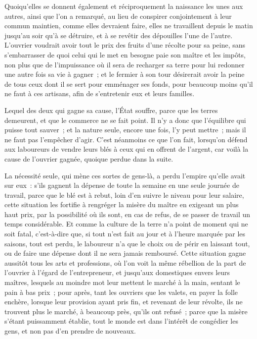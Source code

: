 \documentclass[french,twoside]{book} %
\begin{document}
Quoiqu’elles se donnent également et réciproquement la naissance les unes aux autres, ainsi que l’on a remarqué, au lieu de conspirer conjointement à leur commun maintien, comme elles devraient faire, elles ne travaillent depuis le matin jusqu’au soir qu’à se détruire, et à se revêtir des dépouilles l’une de l’autre. L’ouvrier voudrait avoir tout le prix des fruits d’une récolte pour sa peine, sans s’embarrasser de quoi celui qui le met en besogne paie son maître et les impôts, non plus que de l’impuissance où il sera de recharger sa terre pour lui redonner une autre fois sa vie à gagner ; et le fermier à son tour désirerait avoir la peine de tous ceux dont il se sert pour emménager ses fonds, pour beaucoup moins qu’il ne faut à ces artisans, afin de s’entretenir eux et leurs familles.\par
Lequel des deux qui gagne sa cause, l’État souffre, parce que les terres demeurent, et que le commerce ne se fait point. Il n’y a donc que l’équilibre qui puisse tout sauver ; et la nature seule, encore une fois, l’y peut mettre ; mais il ne faut pas l’empêcher d’agir. C’est néanmoins ce que l’on fait, lorsqu’on défend aux laboureurs de vendre leurs blés à ceux qui en offrent de l’argent, car voilà la cause de l’ouvrier gagnée, quoique perdue dans la suite.\par
La nécessité seule, qui mène ces sortes de gens-là, a perdu l’empire qu’elle avait sur eux : s’ils gagnent la dépense de toute la semaine en une seule journée de travail, parce que le blé est à rebut, loin d’en suivre le niveau pour leur salaire, cette situation les fortifie à rengréger la misère du maître en exigeant un plus haut prix, par la possibilité où ils sont, en cas de refus, de se passer de travail un temps considérable. Et comme la culture de la terre n’a point de moment qui ne soit fatal, c’est-à-dire que, si tout n’est fait au jour et à l’heure marquée par les saisons, tout est perdu, le laboureur n’a que le choix ou de périr en laissant tout, ou de faire une dépense dont il ne sera jamais remboursé. Cette situation gagne aussitôt tous les arts et professions, où l’on voit la même rébellion de la part de l’ouvrier à l’égard de l’entrepreneur, et jusqu’aux domestiques envers leurs maîtres, lesquels au moindre mot leur mettent le marché à la main, sentant le pain à bas prix ; pour après, tant les ouvriers que les valets, en payer la folle enchère, lorsque leur provision ayant pris fin, et revenant de leur révolte, ils ne trouvent plus le marché, à beaucoup près, qu’ils ont refusé ; parce que la misère s’étant puissamment établie, tout le monde est dans l’intérêt de congédier les gens, et non pas d’en prendre de nouveaux.\par
\end{document}
